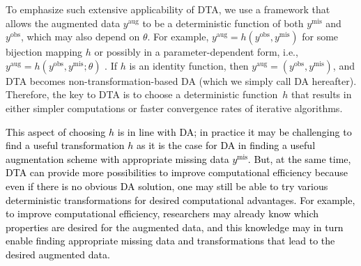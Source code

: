 \documentclass[12pt]{article}
\begin{document}
To emphasize such extensive applicability of DTA, we use a  framework that allows the augmented data $y^{\textrm{aug}}$ to be a deterministic function of both $y^{\textrm{mis}}$ and $y^{\textrm{obs}}$, which may also depend on $\theta$. For example, $y^{\textrm{aug}}=h(y^{\textrm{obs}},  y^{\textrm{mis}})$ for some bijection mapping $h$ \citep{vandyk2010fertilizing} or possibly in a parameter-dependent form, i.e., $y^{\textrm{aug}}=h(y^{\textrm{obs}},  y^{\textrm{mis}}; \theta)$ \citep{papa2007repara}. If $h$ is an identity function,  then $y^{\textrm{aug}}=(y^{\textrm{obs}},  y^{\textrm{mis}})$, and DTA becomes non-transformation-based DA (which we simply call DA hereafter).  Therefore, the key to DTA is to choose a deterministic function~$h$ that results in either simpler computations or faster convergence rates of iterative algorithms.

 \textcolor{black}{This aspect of choosing $h$ is in line with DA; in practice it may be challenging to find a useful transformation $h$  as it is the case for DA in finding a useful augmentation scheme with appropriate missing data $y^{\textrm{mis}}$. But, at the same time, DTA can provide more possibilities to improve computational efficiency because  even if there is no obvious DA solution, one may still be able to try various deterministic transformations for desired computational advantages. For example, to improve computational efficiency, researchers may already know which properties are desired for the augmented data, and this knowledge may in turn enable finding  appropriate missing data and transformations that lead to the desired augmented data.}
\end{document}
